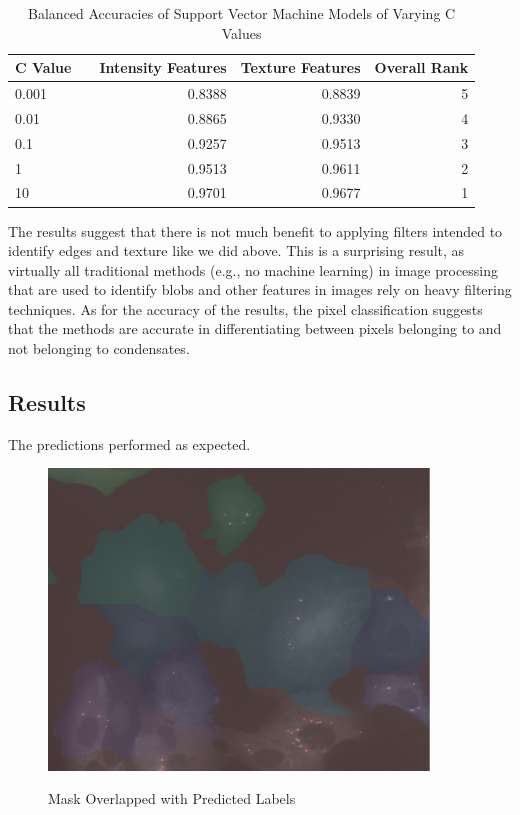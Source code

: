 \documentclass[11pt]{article}
\begin{document}
\begin{table}[H]
    \centering
    \begin{tabular}{llrrr}
        \toprule
        C Value & & Intensity Features & Texture Features & Overall Rank \\
        \midrule
        \textsc{0.001} & & 0.8388 & 0.8839 & 5 \\
        \textsc{0.01}  & & 0.8865 & 0.9330 & 4 \\
        \textsc{0.1}   & & 0.9257 & 0.9513 & 3 \\
        \textsc{1}     & & 0.9513 & 0.9611 & 2 \\
        \textsc{10}    & & 0.9701 & 0.9677 & 1 \\
        \bottomrule
    \end{tabular}
    \caption{\label{tab:svm_search_results} Balanced Accuracies of Support Vector Machine Models of Varying C Values}
\end{table}

The results suggest that there is not much benefit to applying filters intended to identify edges
and texture like we did above. This is a surprising result, as virtually all traditional methods
(e.g., no machine learning) in image processing that are used to identify blobs and other features in
images rely on heavy filtering techniques. As for the accuracy of the results, the pixel
classification suggests that the methods are accurate in differentiating between pixels belonging to
and not belonging to condensates.

\subsection{Results}
The predictions performed as expected.

\begin{figure}[H]
    \centering
    {
        {
            {
                \includegraphics[width=0.9\textwidth]{overlayed.png}
            }
        }
    }\caption{Mask Overlapped with Predicted Labels}
    \label{fig:overlayed}
\end{figure}
\end{document}
